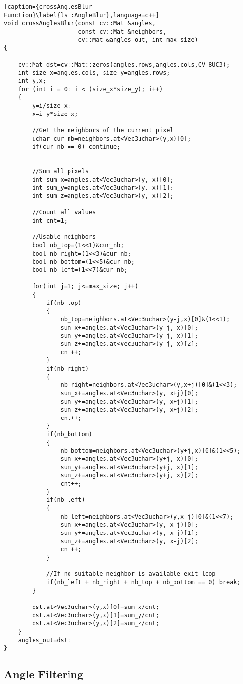 \begin{lstlisting}[caption={crossAnglesBlur - Function}\label{lst:AngleBlur},language=c++]
void crossAnglesBlur(const cv::Mat &angles, 
                     const cv::Mat &neighbors, 
                     cv::Mat &angles_out, int max_size)
{

	cv::Mat dst=cv::Mat::zeros(angles.rows,angles.cols,CV_8UC3);
	int size_x=angles.cols, size_y=angles.rows;
	int y,x;
	for (int i = 0; i < (size_x*size_y); i++)
	{
		y=i/size_x;
		x=i-y*size_x;

		//Get the neighbors of the current pixel
		uchar cur_nb=neighbors.at<Vec3uchar>(y,x)[0];
		if(cur_nb == 0) continue;


		//Sum all pixels
		int sum_x=angles.at<Vec3uchar>(y, x)[0];
		int sum_y=angles.at<Vec3uchar>(y, x)[1];
		int sum_z=angles.at<Vec3uchar>(y, x)[2];

		//Count all values
		int cnt=1;

		//Usable neighbors
		bool nb_top=(1<<1)&cur_nb;
		bool nb_right=(1<<3)&cur_nb;
		bool nb_bottom=(1<<5)&cur_nb;
		bool nb_left=(1<<7)&cur_nb;

		for(int j=1; j<=max_size; j++)
		{
			if(nb_top)
			{
				nb_top=neighbors.at<Vec3uchar>(y-j,x)[0]&(1<<1);
				sum_x+=angles.at<Vec3uchar>(y-j, x)[0];
				sum_y+=angles.at<Vec3uchar>(y-j, x)[1];
				sum_z+=angles.at<Vec3uchar>(y-j, x)[2];
				cnt++;
			}
			if(nb_right)
			{
				nb_right=neighbors.at<Vec3uchar>(y,x+j)[0]&(1<<3);
				sum_x+=angles.at<Vec3uchar>(y, x+j)[0];
				sum_y+=angles.at<Vec3uchar>(y, x+j)[1];
				sum_z+=angles.at<Vec3uchar>(y, x+j)[2];
				cnt++;
			}
			if(nb_bottom)
			{
				nb_bottom=neighbors.at<Vec3uchar>(y+j,x)[0]&(1<<5);
				sum_x+=angles.at<Vec3uchar>(y+j, x)[0];
				sum_y+=angles.at<Vec3uchar>(y+j, x)[1];
				sum_z+=angles.at<Vec3uchar>(y+j, x)[2];
				cnt++;
			}
			if(nb_left)
			{
				nb_left=neighbors.at<Vec3uchar>(y,x-j)[0]&(1<<7);
				sum_x+=angles.at<Vec3uchar>(y, x-j)[0];
				sum_y+=angles.at<Vec3uchar>(y, x-j)[1];
				sum_z+=angles.at<Vec3uchar>(y, x-j)[2];
				cnt++;
			}

			//If no suitable neighbor is available exit loop
			if(nb_left + nb_right + nb_top + nb_bottom == 0) break;
		}

		dst.at<Vec3uchar>(y,x)[0]=sum_x/cnt;
		dst.at<Vec3uchar>(y,x)[1]=sum_y/cnt;
		dst.at<Vec3uchar>(y,x)[2]=sum_z/cnt;
	}
	angles_out=dst;
}
\end{lstlisting}

\subsection{Angle Filtering}

